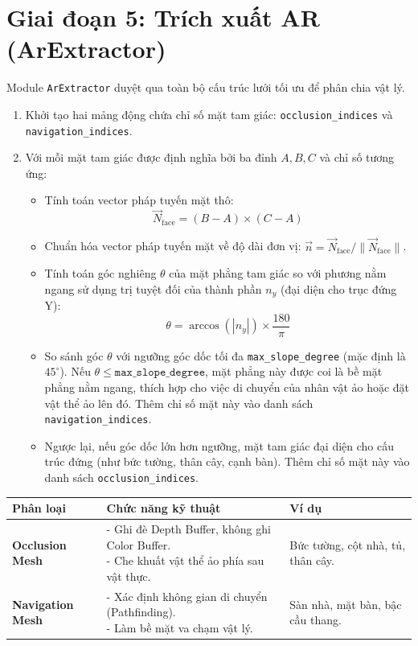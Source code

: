 \documentclass[a4paper,12pt]{report}
\begin{document}
\section{Giai đoạn 5: Trích xuất AR (ArExtractor)}
Module \texttt{ArExtractor} duyệt qua toàn bộ cấu trúc lưới tối ưu để phân chia vật lý.
\begin{enumerate}
    \item Khởi tạo hai mảng động chứa chỉ số mặt tam giác: \texttt{occlusion\_indices} và \texttt{navigation\_indices}.
    \item Với mỗi mặt tam giác được định nghĩa bởi ba đỉnh $A, B, C$ và chỉ số tương ứng:
    \begin{itemize}
        \item Tính toán vector pháp tuyến mặt thô:
        \begin{equation}
            \vec{N}_{\text{face}} = (B - A) \times (C - A)
        \end{equation}
        \item Chuẩn hóa vector pháp tuyến mặt về độ dài đơn vị: $\vec{n} = \vec{N}_{\text{face}} / \|\vec{N}_{\text{face}}\|$.
        \item Tính toán góc nghiêng $\theta$ của mặt phẳng tam giác so với phương nằm ngang sử dụng trị tuyệt đối của thành phần $n_y$ (đại diện cho trục đứng Y):
        \begin{equation}
            \theta = \arccos(|n_y|) \times \frac{180}{\pi}
        \end{equation}
        \item So sánh góc $\theta$ với ngưỡng góc dốc tối đa \texttt{max\_slope\_degree} (mặc định là $45^\circ$). Nếu $\theta \le \texttt{max\_slope\_degree}$, mặt phẳng này được coi là bề mặt phẳng nằm ngang, thích hợp cho việc di chuyển của nhân vật ảo hoặc đặt vật thể ảo lên đó. Thêm chỉ số mặt này vào danh sách \texttt{navigation\_indices}.
        \item Ngược lại, nếu góc dốc lớn hơn ngưỡng, mặt tam giác đại diện cho cấu trúc đứng (như bức tường, thân cây, cạnh bàn). Thêm chỉ số mặt này vào danh sách \texttt{occlusion\_indices}.
    \end{itemize}
\end{enumerate}

\begin{tabularx}{\textwidth}{|p{0.22\textwidth}|X|p{0.3\textwidth}|}
\hline
\textbf{Phân loại} & \textbf{Chức năng kỹ thuật} & \textbf{Ví dụ} \\ \hline
\textbf{Occlusion Mesh} & 
\parbox[t]{\linewidth}{
- Ghi đè Depth Buffer, không ghi Color Buffer.\\
- Che khuất vật thể ảo phía sau vật thực.
} & 
Bức tường, cột nhà, tủ, thân cây. \\ \hline
\textbf{Navigation Mesh} & 
\parbox[t]{\linewidth}{
- Xác định không gian di chuyển (Pathfinding).\\
- Làm bề mặt va chạm vật lý.
} & 
Sàn nhà, mặt bàn, bậc cầu thang. \\ \hline
\end{tabularx}
\end{document}
